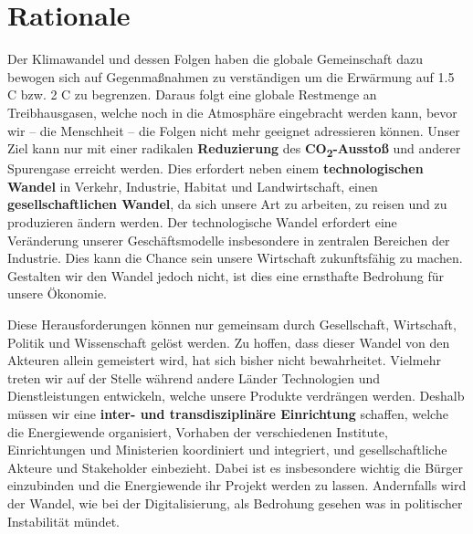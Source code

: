 \section{Rationale}

Der Klimawandel und dessen Folgen haben die globale Gemeinschaft dazu bewogen sich auf Gegenmaßnahmen zu verständigen um die Erwärmung auf 1.5 \degree{}C bzw. 2 \degree{}C zu begrenzen.
Daraus folgt eine globale Restmenge an Treibhausgasen, welche noch in die Atmosphäre eingebracht werden kann, bevor wir -- die Menschheit -- die Folgen nicht mehr geeignet adressieren können.
%
Unser Ziel kann nur mit einer radikalen \textbf{Reduzierung} des \textbf{CO\textsubscript{2}-Ausstoß} und anderer Spurengase erreicht werden.
Dies erfordert neben einem \textbf{technologischen Wandel} in Verkehr, Industrie, Habitat und Landwirtschaft, einen \textbf{gesellschaftlichen Wandel}, da sich unsere Art zu arbeiten, zu reisen und zu produzieren ändern werden.
Der technologische Wandel erfordert eine Veränderung unserer Geschäftsmodelle insbesondere in zentralen Bereichen der Industrie.
Dies kann die Chance sein unsere Wirtschaft zukunftsfähig zu machen.
Gestalten wir den Wandel jedoch nicht, ist dies eine ernsthafte Bedrohung für unsere Ökonomie.

Diese Herausforderungen können nur gemeinsam durch Gesellschaft, Wirtschaft, Politik und Wissenschaft gelöst werden.
Zu hoffen, dass dieser Wandel von den Akteuren allein gemeistert wird, hat sich bisher nicht bewahrheitet.
Vielmehr treten wir auf der Stelle während andere Länder Technologien und Dienstleistungen entwickeln, welche unsere Produkte verdrängen werden. 
Deshalb müssen wir eine \textbf{inter- und transdisziplinäre Einrichtung} schaffen, welche die Energiewende organisiert, Vorhaben der verschiedenen Institute, Einrichtungen und Ministerien koordiniert und integriert, und gesellschaftliche Akteure und Stakeholder einbezieht.
Dabei ist es insbesondere wichtig die Bürger einzubinden und die Energiewende ihr Projekt werden zu lassen.
Andernfalls wird der Wandel, wie bei der Digitalisierung, als Bedrohung gesehen was in politischer Instabilität mündet.


